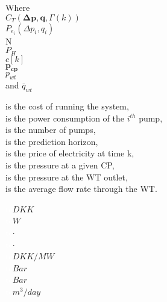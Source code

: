  \begin{minipage}[t]{0.24\textwidth}
 Where\\
 \hspace*{8mm} $C_T(\pmb{\Delta{p}},\pmb{q},\Gamma(k))$ \\
 \hspace*{8mm} $P_{e_{i}}(\Delta{p}_i,q_i)$ \\
 \hspace*{8mm} N \\
 \hspace*{8mm} $P_H$ \\
 \hspace*{8mm} $c[k]$ \\
 \hspace*{8mm} $\pmb{p_{cp}}$ \\
 \hspace*{8mm} $p_{wt}$ \\
  and \hspace*{0.7mm} $\bar{q}_{wt}$	
 \end{minipage}
 \begin{minipage}[t]{0.63\textwidth}
 \vspace*{2mm}
 is the cost of running the system, \\
 is the power consumption of the $i^{th}$ pump,\\
 is the number of pumps,\\
 is the prediction horizon,\\
 is the price of electricity at time k,\\ 
 is the pressure at a given CP,\\ %
 is the pressure at the WT outlet,\\ %
 is the average flow rate through the WT. %
 \end{minipage}
 \begin{minipage}[t]{0.10\textwidth}
 \vspace*{2mm}
 \textcolor{White}{te}$\unit{DKK}$\\
 \textcolor{White}{te}$\unit{W}$\\
 \textcolor{White}{te}$\unit{\cdot}$\\
 \textcolor{White}{te}$\unit{\cdot}$\\
 \textcolor{White}{te}$\unit{{DKK}/{MW}}$\\
 \textcolor{White}{te}$\unit{Bar}$\\
 \textcolor{White}{te}$\unit{Bar}$\\
  \textcolor{White}{te}$\unit{{m^3}/{day}}$
 \end{minipage}

